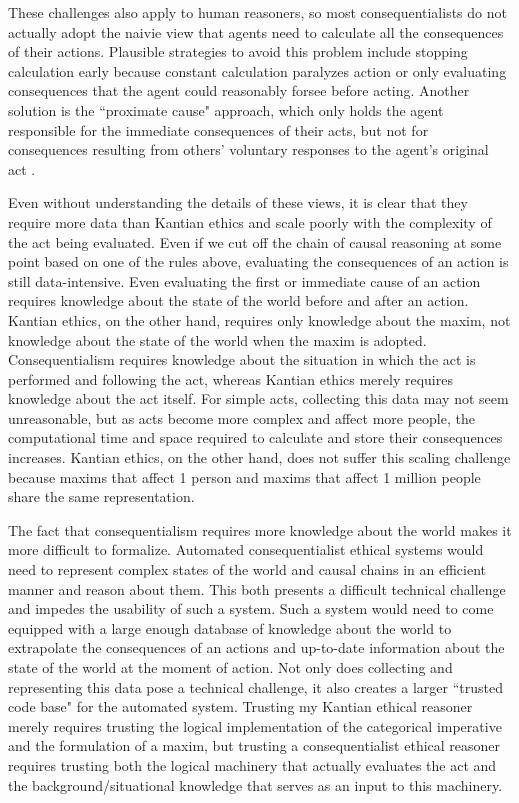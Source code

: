 \begin{isabellebody}
\begin{isamarkuptext}
These challenges also apply to human reasoners, so most consequentialists do not actually adopt the naivie
view that agents need to calculate all the consequences of their actions. Plausible strategies to avoid 
this problem include stopping calculation early because constant calculation paralyzes action or only 
evaluating consequences that the agent could reasonably forsee before acting. Another solution is the 
``proximate cause" approach, which only holds the agent responsible for the immediate consequences of their 
acts, but not for consequences resulting from others' voluntary responses to the agent's original act \cite{consequentialismsep}.

Even without understanding the details of these views, it is clear that they require 
more data than Kantian ethics and scale poorly with the complexity of the act being evaluated. Even 
if we cut off the chain of causal reasoning at some point based on 
one of the rules above, evaluating the consequences of an action is still data-intensive. Even evaluating
the first or immediate cause of an action requires knowledge about the state of the world before
and after an action. Kantian ethics, on the other hand, requires only knowledge about the maxim, not 
knowledge about the state of the world when the maxim is adopted. Consequentialism requires knowledge about 
the situation in which the act is performed and following the act, whereas Kantian ethics merely requires 
knowledge about the act itself. For simple acts, collecting this data may not seem unreasonable, but as acts become
more complex and affect more people, the computational time and space required to calculate and store
their consequences increases. Kantian ethics, on the other hand, does not suffer this scaling
challenge because maxims that affect 1 person and maxims that affect 1 million people share the same
representation.

The fact that consequentialism requires more knowledge about the world makes it more difficult to formalize.
Automated consequentialist ethical systems would need to represent complex states of the world and causal chains
in an efficient manner and reason about them. This both presents a difficult technical challenge and
impedes the usability of such a system. Such a system would need to come equipped with 
a large enough database of knowledge about the world to extrapolate the consequences of an actions and
up-to-date information about the state of the world at the moment of action. Not only does collecting 
and representing this data pose a technical challenge, it also creates a larger ``trusted code base" for 
the automated system. Trusting my Kantian ethical reasoner merely requires trusting the logical implementation
of the categorical imperative and the formulation of a maxim, but trusting a consequentialist ethical 
reasoner requires trusting both the logical machinery that actually evaluates the act and the 
background/situational knowledge that serves as an input to this machinery.


\end{isamarkuptext}
\end{isabellebody}
